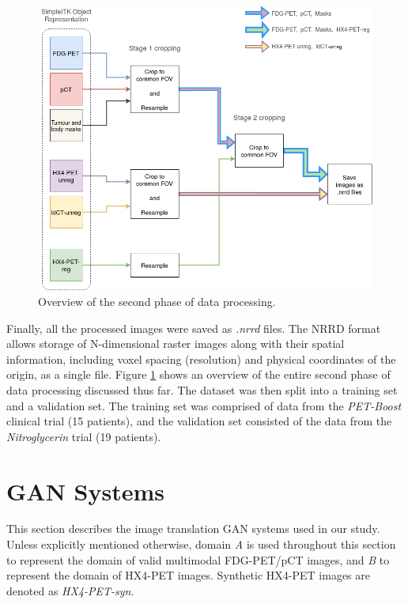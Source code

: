 \begin{figure}[h!]
    \centering
    \includegraphics[width=0.8\linewidth]{figures/Data/data_processing_overview-step_2.png}
    \caption{Overview of the second phase of data processing.}
    \label{fig:data_proc_overview_2}
\end{figure}

Finally, all the processed images were saved as \textit{.nrrd} files. The NRRD format allows storage of N-dimensional raster images along with their spatial information, including voxel spacing (resolution) and physical coordinates of the origin, as a single file. Figure \ref{fig:data_proc_overview_2} shows an overview of the entire second phase of data processing discussed thus far. The dataset was then split into a training set and a validation set. The training set was comprised of data from the \textit{PET-Boost} clinical trial (15 patients), and the validation set consisted of the data from the \textit{Nitroglycerin} trial (19 patients). 



\section{GAN Systems}
\label{GAN_Systems}
This section describes the image translation GAN systems used in our study. Unless explicitly mentioned otherwise, domain \textit{A} is used throughout this section to represent the domain of valid multimodal FDG-PET/pCT images, and \textit{B} to represent the domain of HX4-PET images. Synthetic HX4-PET images are denoted as \textit{HX4-PET-syn}.


